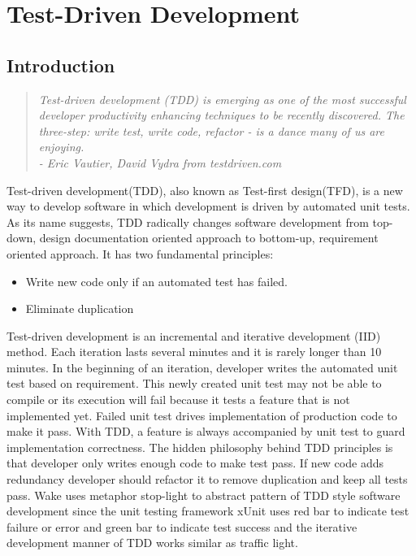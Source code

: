 \section{Test-Driven Development}
\subsection{Introduction}
\begin{quote}
\textit{Test-driven development (TDD) is emerging as one of the most successful
developer productivity enhancing techniques to be recently discovered. The
three-step: write test, write code, refactor - is a dance many of us are
enjoying. \\
  - Eric Vautier, David Vydra from testdriven.com}
\end{quote}

Test-driven development(TDD), also known as Test-first design(TFD), is a
new way to develop software in which development is driven by automated
unit tests. As its name suggests, TDD radically changes software
development from top-down, design documentation oriented approach to
bottom-up, requirement oriented approach. It has two fundamental
principles\cite{Beck:03}: {\it
\begin{itemize}
\item Write new code only if an automated test has failed.
\item Eliminate duplication
\end{itemize}
} Test-driven development is an incremental and iterative development (IID)
method\cite{Larman:03}. Each iteration lasts several minutes and it is
rarely longer than 10 minutes. In the beginning of an iteration, developer
writes the automated unit test based on requirement. This newly created
unit test may not be able to compile or its execution will fail because it
tests a feature that is not implemented yet. Failed unit test drives
implementation of production code to make it pass. With TDD, a feature is
always accompanied by unit test to guard implementation correctness. The
hidden philosophy behind TDD principles is that developer only writes
enough code to make test pass. If new code adds redundancy developer should
refactor it to remove duplication and keep all tests pass.
Wake\cite{StopLight} uses metaphor stop-light to abstract pattern of TDD
style software development since the unit testing framework xUnit uses red
bar to indicate test failure or error and green bar to indicate test
success and the iterative development manner of TDD works similar as
traffic light.

